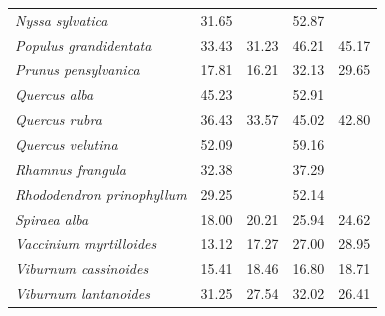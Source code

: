 \documentclass{article}
\begin{document}
\begin{table}[ht]
\begin{tabular}{lrrrr}
  \textit{Nyssa sylvatica} & 31.65 &  & 52.87 &  \\ 
  \textit{Populus grandidentata} & 33.43 & 31.23 & 46.21 & 45.17 \\ 
  \textit{Prunus pensylvanica} & 17.81 & 16.21 & 32.13 & 29.65 \\ 
  \textit{Quercus alba} & 45.23 &  & 52.91 &  \\ 
  \textit{Quercus rubra} & 36.43 & 33.57 & 45.02 & 42.80 \\ 
  \textit{Quercus velutina} & 52.09 &  & 59.16 &  \\ 
  \textit{Rhamnus frangula} & 32.38 &  & 37.29 &  \\ 
  \textit{Rhododendron prinophyllum} & 29.25 &  & 52.14 &  \\ 
  \textit{Spiraea alba} & 18.00 & 20.21 & 25.94 & 24.62 \\ 
  \textit{Vaccinium myrtilloides} & 13.12 & 17.27 & 27.00 & 28.95 \\ 
  \textit{Viburnum cassinoides} & 15.41 & 18.46 & 16.80 & 18.71 \\ 
  \textit{Viburnum lantanoides} & 31.25 & 27.54 & 32.02 & 26.41 \\ 
   \hline
\end{tabular}
\end{table}
\end{document}
